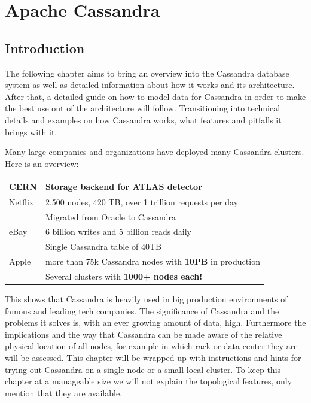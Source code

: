 \chapter{Apache Cassandra}

\section{Introduction}


The following chapter aims to bring an overview into the Cassandra database system as well as detailed information about how it works and its architecture.
After that, a detailed guide on how to model data for Cassandra in order to make the best use out of the architecture will follow.
Transitioning into technical details and examples on how Cassandra works, what features and pitfalls it brings with it.


Many large companies and organizations have deployed many Cassandra clusters. 
Here is an overview: \\

  \begin{tabular}{@{}ll}
    CERN    & Storage backend for ATLAS detector \autocite{cassandra_cern} \\
    \hline
    Netflix & 2,500 nodes, 420 TB, over 1 trillion requests per day \\
            & Migrated from Oracle to Cassandra \autocite{cassandra_netflix} \\
    \hline
    eBay    & 6 billion writes and 5 billion reads daily \\
            & Single Cassandra table of 40TB \autocite{cassandra_ebay, cassandra_ebay2} \\
    \hline
    Apple   & more than 75k Cassandra nodes with \textbf{10PB} in production \\
            & Several clusters with \textbf{1000+ nodes each!} \autocite{cassandra_apple} \\
  \end{tabular}

This shows that Cassandra is heavily used in big production environments of famous and leading tech companies. The significance of Cassandra and the problems it solves is, with an ever growing amount of data, high. Furthermore the implications and the way that Cassandra can be made aware of the relative physical location of all nodes, for example in which rack or data center they are will be assessed. This chapter will be wrapped up with instructions and hints for trying out Cassandra on a single node or a small local cluster. To keep this chapter at a manageable size we will not explain the topological features, only mention that they are available.

